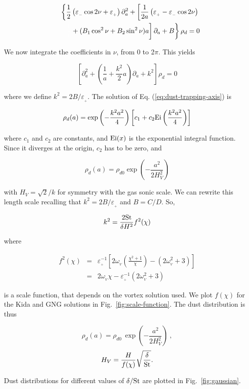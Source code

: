 \documentclass[apj]{emulateapj}
\def\white#1{\textcolor{white}{#1}}
\newcommand{\Eq}[1]{Eq. (\ref{#1})}
\newcommand{\eq}[1]{\Eq{#1}}
\newcommand{\Fig}[1]{Fig.~\ref{#1}}
\newcommand{\fig}[1]{\Fig{#1}}
\newcommand{\beq}{\begin{equation}}
\newcommand{\eeq}{\end{equation}}
\newcommand{\beqn}{\begin{eqnarray}}
\newcommand{\eeqn}{\end{eqnarray}}
\newcommand{\epsp}{\varepsilon_{_{+}}}
\newcommand{\epsm}{\varepsilon_{_{-}}}
\begin{document}
\beqn
&&\left\{\frac{1}{2}\left(\epsm \cos 2\nu +\epsp\right) \partial^2_a  +  \left[\frac{1}{2a}\left( \epsp - \epsm\cos 2\nu\right) \right.\right. \nonumber\\
&&\left.\left.\white{\frac{1}{1}}+ (B_1\cos^2\nu +  B_2\sin^2\nu)a\right] \partial_a  + B\right\} \rho_d = 0 
\eeqn

We now integrate the coefficients in $\nu$, from 0 to 2$\pi$. This yields


\beq\label{eq:dust-trapping-axis}
\left[\partial^2_a  +  \left(\frac{1}{a} +  \frac{k^2}{2}a\right) \partial_a  + k^2\right]\rho_d = 0 
\eeq

\noindent where we define $k^2=2B/\epsp$. The solution of
\eq{eq:dust-trapping-axis} is 

\beq
\rho_d(a) = \exp\left(-\frac{k^2a^2}{4}\right)  \left[c_1 + c_2 {\rm
    Ei}\left(\frac{k^2a^2}{4}\right)\right]
\eeq

\noindent where $c_1$ and $c_2$ are constants, and ${\rm Ei}(x)$ is the exponential integral function. 
Since it diverges at the origin, $c_2$ has to be zero, and 

\beq
\rho_d(a) = \rho_{d0} \exp\left(-\frac{a^2}{2H_V^2}\right)
\eeq

\noindent with $H_V = \sqrt{2}/k$ for symmetry with the gas sonic scale. We can 
rewrite this length scale recalling that $k^2=2B/\epsp$ and
$B=C/D$. So, 

\beqn
k^2 = \frac{2{\rm St}}{\delta H^2} f^2(\chi)
\eeqn 

\noindent where 

\beqn
f^2(\chi) &=& \epsp^{-1} \left[2\omega_{_V}\left(\frac{\chi^2+1}{\chi}\right) - (2\omega_{_V}^2 + 3) \right]\nonumber \\
          &=& 2\omega_{_V}\chi - \epsp^{-1}(2\omega_{_V}^2 + 3)
\eeqn

\noindent is a scale function, that depends on the vortex solution
used. We plot $f(\chi)$ for the Kida and GNG solutions in
\fig{fig:scale-function}. The dust distribution is thus 

\beq\label{eq:gen_axi}
\rho_d(a) = \rho_{d0} \ \exp\left(-\frac{a^2}{2H_V^2}\right) \ ,
\eeq
\beq
 H_V = \frac{H}{f(\chi)} \sqrt{\frac{\delta}{\rm St}}. 
\eeq

Dust distributions for different values of
$\delta/{\rm St}$ are plotted in \fig{fig:gaussian}.
\end{document}

